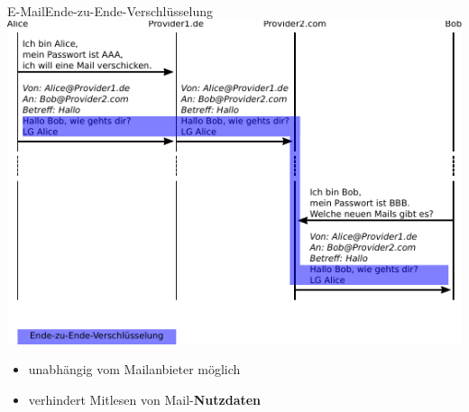  \begin{frame}{E-Mail}{Ende-zu-Ende-Verschlüsselung}
    \includegraphics[width=\textwidth]{images/maildaten_e2e.pdf}
    \begin{itemize}
      \scriptsize
      \item unabhängig vom Mailanbieter möglich
      \item verhindert Mitlesen von Mail-\textbf{Nutzdaten}
    \end{itemize}
  \end{frame}

